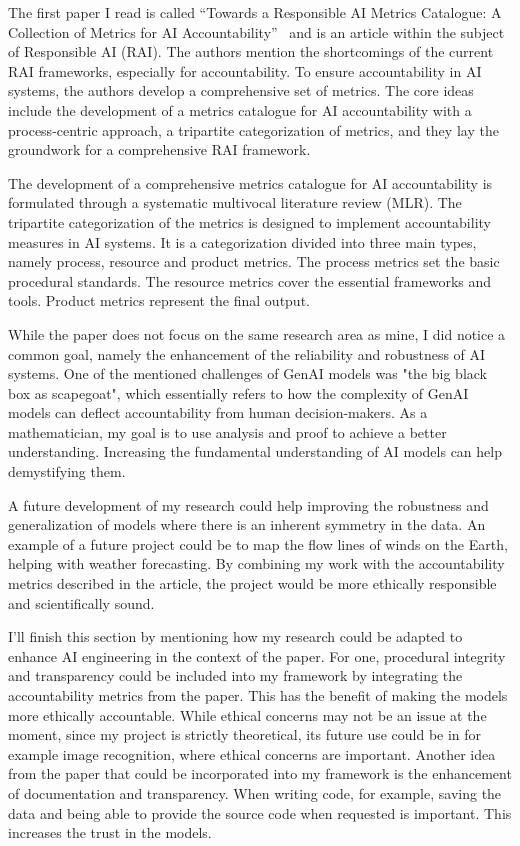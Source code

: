 \documentclass[11pt]{article}
\begin{document}
The first paper I read is called “Towards a Responsible AI Metrics Catalogue: A Collection of Metrics for AI Accountability”~\cite{xia2024responsibleaimetricscatalogue} and is an article within the subject of Responsible AI (RAI). The authors mention the shortcomings of the current RAI frameworks, especially for accountability. To ensure accountability in AI systems, the authors develop a comprehensive set of metrics. 
The core ideas include the development of a metrics catalogue for AI accountability with a process-centric approach, a tripartite categorization of metrics, and they lay the groundwork for a comprehensive RAI framework.

The development of a comprehensive metrics catalogue for AI accountability is formulated through a systematic multivocal literature review (MLR). The tripartite categorization of the metrics is designed to implement accountability measures in AI systems. It is a categorization divided into three main types, namely process, resource and product metrics. The process metrics set the basic procedural standards. The resource metrics cover the essential frameworks and tools. Product metrics represent the final output.

While the paper does not focus on the same research area as mine, I did notice a common goal, namely the enhancement of the reliability and robustness of AI systems. One of the mentioned challenges of GenAI models was "the big black box as scapegoat", which essentially refers to how the complexity of GenAI models can deflect accountability from human decision-makers. As a mathematician, my goal is to use analysis and proof to achieve a better understanding. Increasing the fundamental understanding of AI models can help demystifying them.

A future development of my research could help improving the robustness and generalization of models where there is an inherent symmetry in the data. An example of a future project could be to map the flow lines of winds on the Earth, helping with weather forecasting. By combining my work with the accountability metrics described in the article, the project would be more ethically responsible and scientifically sound.

I'll finish this section by mentioning how my research could be adapted to enhance AI engineering in the context of the paper. For one, procedural integrity and transparency could be included into my framework by integrating the accountability metrics from the paper. This has the benefit of making the models more ethically accountable. While ethical concerns may not be an issue at the moment, since my project is strictly theoretical, its future use could be in for example image recognition, where ethical concerns are important. Another idea from the paper that could be incorporated into my framework is the enhancement of documentation and transparency. When writing code, for example, saving the data and being able to provide the source code when requested is important. This increases the trust in the models.
\end{document}
